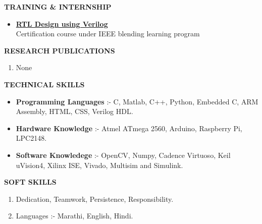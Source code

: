 \documentclass[a4paper]{article}
\begin{document}
	\begin{flushleft}
		\vspace{5mm}
		\large{\textbf{TRAINING \& INTERNSHIP }} 
		\vspace{0.5mm}
		\noindent\hrulefill
		\vspace{0.5mm}
	\end{flushleft}
	\begin{itemize}
		\item \href{https://blended-learning.ieee.org/BLPLMS/CL21/ProgramCertificate.aspx?ProductId=129&UserId=3148}{\textbf{RTL Design using Verilog}}\\
					Certification course under IEEE blending learning program              
	\end{itemize}

	\begin{flushleft}
		\vspace{5mm}
		\large{\textbf{RESEARCH PUBLICATIONS }} 
		\vspace{0.5mm}
		\noindent\hrulefill
		\vspace{0.5mm}
	\end{flushleft}
	\begin{enumerate}
		\item None              
	\end{enumerate}

	\begin{flushleft}
		\vspace{5mm}
		\large{\textbf{TECHNICAL SKILLS }} 
		\vspace{0.5mm}
		\noindent\hrulefill
		\vspace{0.5mm}
	\end{flushleft}
	\begin{itemize}
		\item \textbf{Programming Languages} :- C, Matlab, C++, Python, Embedded C, ARM Assembly, HTML, CSS, Verilog HDL.
		\item \textbf{Hardware Knowledge} :- Atmel ATmega 2560, Arduino, Raspberry Pi, LPC2148.
		\item \textbf{Software Knowledege} :- OpenCV, Numpy, Cadence Virtuoso, Keil uVision4, Xilinx ISE, Vivado, Multisim and Simulink.		             
	\end{itemize}

	\begin{flushleft}
		\vspace{5mm}
		\large{\textbf{SOFT SKILLS }} 
		\vspace{0.5mm}
		\noindent\hrulefill
		\vspace{0.5mm}
	\end{flushleft}
	\begin{enumerate}
		\item  Dedication, Teamwork, Persistence, Responsibility.
		\item  Languages :- Marathi, English, Hindi.        
	\end{enumerate}
\end{document}
